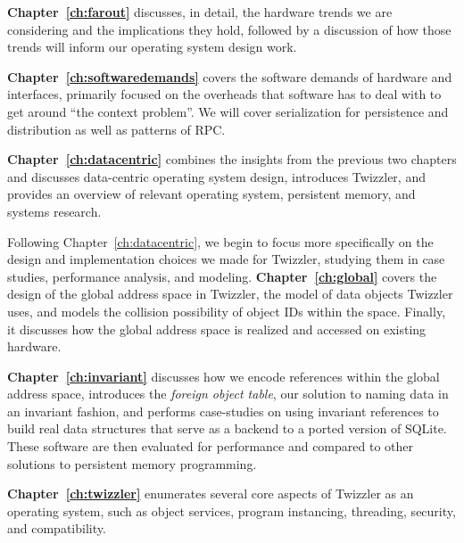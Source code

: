 \noindent\textbf{Chapter~\ref{ch:farout}} discusses, in detail, the hardware trends we are considering and the implications they
hold, followed by a discussion of how those trends will inform our operating system design work.

\vspace{1.5em}

\noindent\textbf{Chapter~\ref{ch:softwaredemands}} covers the software demands of hardware and interfaces, primarily focused on
the overheads that software has to deal with to get around ``the context problem''. We will cover
serialization for
persistence and distribution as well as patterns of RPC.

\vspace{1.5em}

\noindent\textbf{Chapter~\ref{ch:datacentric}} combines the insights from the previous two chapters and discusses data-centric
operating system design, introduces Twizzler, and provides an overview of relevant operating system, persistent memory,
and systems research.

\vspace{1.5em}

\noindent Following Chapter~\ref{ch:datacentric}, we begin to focus more specifically on the design and implementation choices we
made for Twizzler, studying them in case studies, performance analysis, and modeling.
\textbf{Chapter~\ref{ch:global}} covers the design of the global address space in Twizzler, the model of data objects
Twizzler uses, and models the collision possibility of object IDs within the space. Finally, it discusses how the global
address space is realized and accessed on existing hardware.

\vspace{1.5em}

\noindent\textbf{Chapter~\ref{ch:invariant}} discusses how we encode references within the global address space, introduces the
\emph{foreign object table}, our solution to naming data in an invariant fashion, and performs case-studies on using
invariant references to build real data structures that serve as a backend to a ported version of SQLite. These software
are then evaluated for performance and compared to other solutions to persistent memory programming.

\vspace{1.5em}

\noindent\textbf{Chapter~\ref{ch:twizzler}} enumerates several core aspects of Twizzler as an operating system, such as object
services, program instancing, threading, security, and \unix compatibility.

